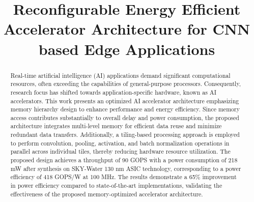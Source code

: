 \documentclass[conference]{IEEEtran}
\begin{document}
\title{Reconfigurable Energy Efficient Accelerator Architecture for CNN based Edge Applications
}

\author{
\and
{}
\and
{}
}
\maketitle
\begin{abstract}
Real-time artificial intelligence (AI) applications demand significant computational resources, often exceeding the capabilities of general-purpose processors. Consequently, research focus has shifted towards application-specific hardware, known as AI accelerators. This work presents an optimized AI accelerator architecture emphasizing memory hierarchy design to enhance performance and energy efficiency. Since memory access contributes substantially to overall delay and power consumption, the proposed architecture integrates multi-level memory for efficient data reuse and minimize redundant data transfers. Additionally, a tiling-based processing approach is employed to perform convolution, pooling, activation, and batch normalization operations in parallel across individual tiles, thereby reducing hardware resource utilization. The proposed design achieves a throughput of 90 GOPS with a power consumption of 218 mW after synthesis on SKY-Water 130 nm ASIC technology, corresponding to a power efficiency of 418 GOPS/W at 100 MHz. The results demonstrate a 65$\%$ improvement in power efficiency compared to state-of-the-art implementations, validating the effectiveness of the proposed memory-optimized accelerator architecture.
\end{abstract}
\end{document}
